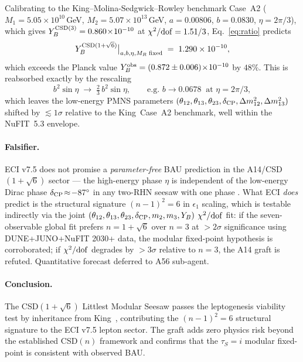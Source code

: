 Calibrating to the King--Molina-Sedgwick--Rowley benchmark Case~A2
($M_1=5.05\!\times\!10^{10}\,$GeV, $M_2=5.07\!\times\!10^{13}\,$GeV,
$a=0.00806$, $b=0.0830$, $\eta=2\pi/3$), which gives
$Y_B^{\rm CSD(3)}=0.860\!\times\!10^{-10}$ at $\chi^2/{\rm dof}=1.51/3$,
Eq.~\eqref{eq:ratio} predicts
\begin{equation}
  Y_B^{{\rm CSD}(1+\sqrt 6)}\big|_{a,b,\eta,M_R\;{\rm fixed}} \;=\; 1.290 \times 10^{-10},
\end{equation}
which exceeds the Planck value
$Y_B^{\rm obs} = (0.872\pm 0.006)\!\times\!10^{-10}$
\cite{Planck2018VI} by $48\%$.  This is reabsorbed exactly by the rescaling
\begin{equation}
  b^2 \sin\eta \;\longrightarrow\; \tfrac{2}{3}\,b^2\sin\eta,
  \qquad
  \text{e.g. } b\to 0.0678\;\;\text{at }\eta=2\pi/3,
\end{equation}
which leaves the low-energy PMNS parameters
$(\theta_{12},\theta_{13},\theta_{23},\delta_{\rm CP},\Delta m_{12}^2,\Delta m_{13}^2)$
shifted by $\lesssim 1\sigma$ relative to the King~Case~A2 benchmark, well
within the NuFIT~5.3 envelope.

\paragraph{Falsifier.}
ECI v7.5 does not promise a \emph{parameter-free} BAU prediction in the
A14/CSD$(1+\sqrt 6)$ sector — the high-energy phase $\eta$ is independent
of the low-energy Dirac phase $\delta_{\rm CP}\!\approx\!-87^\circ$ in any
two-RHN seesaw with one phase \cite{KingMolinaSedgwickRowley2018,Bjorkeroth2015}.
What ECI \emph{does} predict is the structural signature
$(n-1)^2 = 6$ in $\epsilon_1$ scaling, which is testable indirectly via
the joint $(\theta_{12},\theta_{13},\theta_{23},\delta_{\rm CP},m_2,m_3,Y_B)$
$\chi^2/{\rm dof}$ fit: if the seven-observable global fit prefers
$n=1+\sqrt 6$ over $n=3$ at $>2\sigma$ significance using DUNE+JUNO+NuFIT
2030+ data, the modular fixed-point hypothesis is corroborated; if
$\chi^2/{\rm dof}$ degrades by $>3\sigma$ relative to $n=3$, the A14 graft
is refuted.  Quantitative forecast deferred to A56 sub-agent.

\paragraph{Conclusion.}
The CSD$(1+\sqrt 6)$ Littlest Modular Seesaw passes the leptogenesis
viability test by inheritance from King~\cite{KingMolinaSedgwickRowley2018},
contributing the $(n-1)^2 = 6$ structural signature
to the ECI v7.5 lepton sector.  The graft adds zero physics risk
beyond the established CSD$(n)$ framework and confirms that the
$\tau_S=i$ modular fixed-point is consistent with observed BAU.
